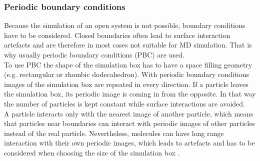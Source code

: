 \subsubsection{Periodic boundary conditions}
\label{subsec:pbc}
Because the simulation of an open system is not possible, boundary conditions have to be considered. Closed boundaries often lead to surface interaction artefacts and are therefore in most cases not suitable for MD simulation. That is why usually periodic boundary conditions (PBC) are used.\\
To use PBC the shape of the simulation box has to have a space filling geometry (e.g. rectangular or rhombic dodecahedron). With periodic boundary conditions images of the simulation box are repeated in every direction. If a particle leaves the simulation box, its periodic image is coming in from the opposite. In that way the number of particles is kept constant while surface interactions are avoided.\\
A particle interacts only with the nearest image of another particle, which means that particles near boundaries can interact with periodic images of other particles instead of the real particle. Nevertheless, molecules can have long range interaction with their own periodic images, which leads to artefacts and has to be considered when choosing the size of the simulation box \autocite[p. 141f]{greenBook}.
